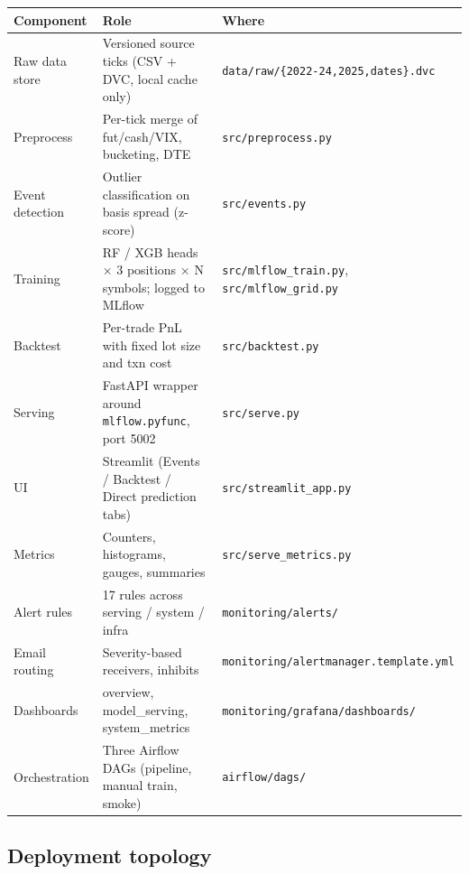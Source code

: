 \documentclass[11pt,a4paper]{article}
\begin{document}
\begin{tabularx}{\linewidth}{@{}lXl@{}}
\toprule
\textbf{Component} & \textbf{Role} & \textbf{Where} \\
\midrule
Raw data store          & Versioned source ticks (CSV + DVC, local cache only)              & \texttt{data/raw/\{2022-24,2025,dates\}.dvc} \\
Preprocess              & Per-tick merge of fut/cash/VIX, bucketing, DTE                    & \texttt{src/preprocess.py} \\
Event detection         & Outlier classification on basis spread (z-score)                  & \texttt{src/events.py} \\
Training                & RF / XGB heads $\times$ 3 positions $\times$ N symbols; logged to MLflow    & \texttt{src/mlflow\_train.py}, \texttt{src/mlflow\_grid.py} \\
Backtest                & Per-trade PnL with fixed lot size and txn cost                    & \texttt{src/backtest.py} \\
Serving                 & FastAPI wrapper around \texttt{mlflow.pyfunc}, port 5002          & \texttt{src/serve.py} \\
UI                      & Streamlit (Events / Backtest / Direct prediction tabs)            & \texttt{src/streamlit\_app.py} \\
Metrics                 & Counters, histograms, gauges, summaries                           & \texttt{src/serve\_metrics.py} \\
Alert rules             & 17 rules across serving / system / infra                          & \texttt{monitoring/alerts/} \\
Email routing           & Severity-based receivers, inhibits                                & \texttt{monitoring/alertmanager.template.yml} \\
Dashboards              & overview, model\_serving, system\_metrics                         & \texttt{monitoring/grafana/dashboards/} \\
Orchestration           & Three Airflow DAGs (pipeline, manual train, smoke)                & \texttt{airflow/dags/} \\
\bottomrule
\end{tabularx}

\subsection{Deployment topology}
\end{document}
